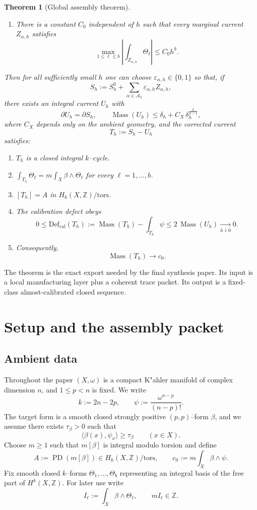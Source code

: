 \documentclass[11pt]{article}
\numberwithin{equation}{section}
\theoremstyle{plain}
\newtheorem{theorem}{Theorem}[section]
\theoremstyle{definition}
\theoremstyle{remark}
\DeclareMathOperator{\Mass}{Mass}
\DeclareMathOperator{\PD}{PD}
\newcommand{\Z}{\mathbb{Z}}
\newcommand{\calA}{\mathcal{A}}
\newcommand{\Defcal}{\mathrm{Def}_{\mathrm{cal}}}
\begin{document}
\begin{theorem}[Global assembly theorem]
\begin{enumerate}
\item[\textnormal{(A3)}] There is a constant $C_0$ independent of $h$ such that every marginal current $Z_{\alpha,h}$ satisfies
\[
\max_{1\le \ell\le b}\left|\int_{Z_{\alpha,h}}\Theta_\ell\right|\le C_0 h^k.
\]
\end{enumerate}
Then for all sufficiently small $h$ one can choose $\varepsilon_{\alpha,h}\in\{0,1\}$ so that, if
\[
S_h:=S_h^0+\sum_{\alpha\in\calA_h}\varepsilon_{\alpha,h} Z_{\alpha,h},
\]
there exists an integral current $U_h$ with
\[
\partial U_h=\partial S_h,
\qquad
\Mass(U_h)\le \delta_h+C_X\,\delta_h^{\frac{k}{k-1}},
\]
where $C_X$ depends only on the ambient geometry, and the corrected current
\[
T_h:=S_h-U_h
\]
satisfies:
\begin{enumerate}
\item[\textnormal{(i)}] $T_h$ is a closed integral $k$--cycle.
\item[\textnormal{(ii)}] $\int_{T_h}\Theta_\ell=m\int_X \beta\wedge\Theta_\ell$ for every $\ell=1,\dots,b$.
\item[\textnormal{(iii)}] $[T_h]=A$ in $H_k(X,\Z)/\mathrm{tors}$.
\item[\textnormal{(iv)}] The calibration defect obeys
\[
0\le \Defcal(T_h):=\Mass(T_h)-\int_{T_h}\psi\le 2\,\Mass(U_h)\xrightarrow[h\downarrow 0]{}0.
\]
\item[\textnormal{(v)}] Consequently,
\[
\Mass(T_h)\to c_0.
\]
\end{enumerate}
\end{theorem}

The theorem is the exact export needed by the final synthesis paper.  Its input is a local manufacturing layer plus a coherent trace packet.  Its output is a fixed-class almost-calibrated closed sequence.

\section{Setup and the assembly packet}\label{sec:setup}

\subsection{Ambient data}

Throughout the paper $(X,\omega)$ is a compact K"ahler manifold of complex dimension $n$, and $1\le p<n$ is fixed.  We write
\[
k:=2n-2p,
\qquad
\psi:=\frac{\omega^{n-p}}{(n-p)!}.
\]
The target form is a smooth closed strongly positive $(p,p)$--form $\beta$, and we assume there exists $\tau_\beta>0$ such that
\[
\langle\beta(x),\psi_x\rangle\ge \tau_\beta
\qquad (x\in X).
\]
Choose $m\ge 1$ such that $m[\beta]$ is integral modulo torsion and define
\[
A:=\PD(m[\beta])\in H_k(X,\Z)/\mathrm{tors},
\qquad
c_0:=m\int_X \beta\wedge\psi.
\]
Fix smooth closed $k$--forms $\Theta_1,\dots,\Theta_b$ representing an integral basis of the free part of $H^k(X,\Z)$.  For later use write
\[
I_\ell:=\int_X \beta\wedge\Theta_\ell,
\qquad
mI_\ell\in\Z.
\]
\end{document}
